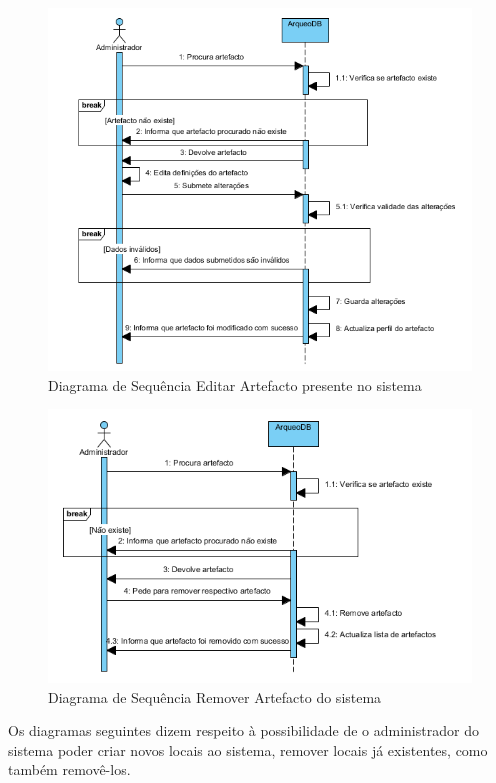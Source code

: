 ﻿\documentclass[12pt,a4paper]{article}
\begin{document}
\begin{figure}[h!]
\centering
\includegraphics[scale=1]{sequencia/A_editarartefacto}
\caption{Diagrama de Sequência Editar Artefacto presente no sistema} 
\end{figure}  

\begin{figure}[h!]
\centering
\includegraphics[scale=1]{sequencia/A_removerartefacto}
\caption{Diagrama de Sequência Remover Artefacto do sistema} 
\end{figure}  
  
  
\clearpage
Os diagramas seguintes dizem respeito à possibilidade de o administrador do sistema poder criar novos locais ao sistema, remover locais já existentes, como também removê-los.\\
\end{document}

